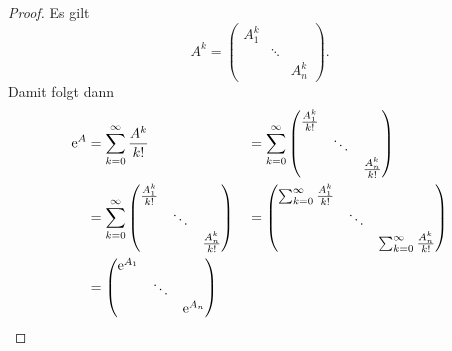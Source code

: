 \begin{proof}
    Es gilt
    \begin{equation*}
        A^k = \begin{pmatrix}
                  A^k_1 &        & \\
                        & \ddots & \\
                        &        & A^k_n
        \end{pmatrix}.
    \end{equation*}
    Damit folgt dann
    \begin{alignat*}{2}
        \mathrm{e}^A
        &= \sum^\infty_{k=0} \frac{A^k}{k!}
            &&= \sum^\infty_{k=0}
            \begin{pmatrix}
                \frac{A^k_1}{k!} &        & \\
                                 & \ddots & \\
                                 &        & \frac{A^k_n}{k!}
            \end{pmatrix}\\
        &= \sum^\infty_{k=0}
            \begin{pmatrix}
                \frac{A^k_1}{k!} &        & \\
                                 & \ddots & \\
                                 &        & \frac{A^k_n}{k!}
            \end{pmatrix}
            &&= \begin{pmatrix}
                    \sum^\infty_{k=0} \frac{A^k_1}{k!} &        & \\
                                                       & \ddots & \\
                                                       &        & \sum^\infty_{k=0} \frac{A^k_n}{k!}
            \end{pmatrix}\\
        &= \begin{pmatrix}
               \mathrm{e}^{A_1} &        & \\
                        & \ddots & \\
                        &        & \mathrm{e}^{A_n}
        \end{pmatrix}
    \end{alignat*}
\end{proof}

